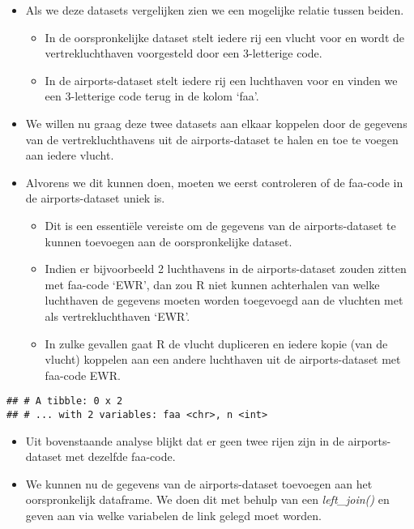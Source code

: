 \documentclass[]{memoir}
\providecommand{\tightlist}{%
  \setlength{\itemsep}{0pt}\setlength{\parskip}{0pt}}
\begin{document}
\begin{itemize}
\tightlist
\item
  Als we deze datasets vergelijken zien we een mogelijke relatie tussen beiden.

  \begin{itemize}
  \tightlist
  \item
    In de oorspronkelijke dataset stelt iedere rij een vlucht voor en wordt de vertrekluchthaven voorgesteld door een 3-letterige code.
  \item
    In de airports-dataset stelt iedere rij een luchthaven voor en vinden we een 3-letterige code terug in de kolom `faa'.
  \end{itemize}
\item
  We willen nu graag deze twee datasets aan elkaar koppelen door de gegevens van de vertrekluchthavens uit de airports-dataset te halen en toe te voegen aan iedere vlucht.
\item
  Alvorens we dit kunnen doen, moeten we eerst controleren of de faa-code in de airports-dataset uniek is.

  \begin{itemize}
  \tightlist
  \item
    Dit is een essentiële vereiste om de gegevens van de airports-dataset te kunnen toevoegen aan de oorspronkelijke dataset.
  \item
    Indien er bijvoorbeeld 2 luchthavens in de airports-dataset zouden zitten met faa-code `EWR', dan zou R niet kunnen achterhalen van welke luchthaven de gegevens moeten worden toegevoegd aan de vluchten met als vertrekluchthaven `EWR'.
  \item
    In zulke gevallen gaat R de vlucht dupliceren en iedere kopie (van de vlucht) koppelen aan een andere luchthaven uit de airports-dataset met faa-code EWR.
  \end{itemize}
\end{itemize}

\begin{verbatim}
## # A tibble: 0 x 2
## # ... with 2 variables: faa <chr>, n <int>
\end{verbatim}

\begin{itemize}
\tightlist
\item
  Uit bovenstaande analyse blijkt dat er geen twee rijen zijn in de airports-dataset met dezelfde faa-code.
\item
  We kunnen nu de gegevens van de airports-dataset toevoegen aan het oorspronkelijk dataframe. We doen dit met behulp van een \emph{left\_join()} en geven aan via welke variabelen de link gelegd moet worden.
\end{itemize}
\end{document}
